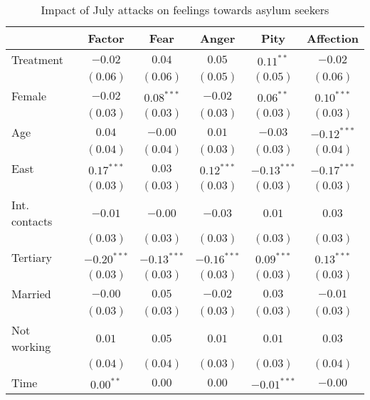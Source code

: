 
\begin{table}
\caption{Impact of July attacks on feelings towards asylum seekers}
\begin{center}
\begin{tabular}{l c c c c c}
\toprule
 & Factor & Fear & Anger & Pity & Affection \\
\midrule
Treatment     & $-0.02$       & $0.04$        & $0.05$        & $0.11^{**}$   & $-0.02$       \\
              & $(0.06)$      & $(0.06)$      & $(0.05)$      & $(0.05)$      & $(0.06)$      \\
Female        & $-0.02$       & $0.08^{***}$  & $-0.02$       & $0.06^{**}$   & $0.10^{***}$  \\
              & $(0.03)$      & $(0.03)$      & $(0.03)$      & $(0.03)$      & $(0.03)$      \\
Age           & $0.04$        & $-0.00$       & $0.01$        & $-0.03$       & $-0.12^{***}$ \\
              & $(0.04)$      & $(0.04)$      & $(0.03)$      & $(0.03)$      & $(0.04)$      \\
East          & $0.17^{***}$  & $0.03$        & $0.12^{***}$  & $-0.13^{***}$ & $-0.17^{***}$ \\
              & $(0.03)$      & $(0.03)$      & $(0.03)$      & $(0.03)$      & $(0.03)$      \\
Int. contacts & $-0.01$       & $-0.00$       & $-0.03$       & $0.01$        & $0.03$        \\
              & $(0.03)$      & $(0.03)$      & $(0.03)$      & $(0.03)$      & $(0.03)$      \\
Tertiary      & $-0.20^{***}$ & $-0.13^{***}$ & $-0.16^{***}$ & $0.09^{***}$  & $0.13^{***}$  \\
              & $(0.03)$      & $(0.03)$      & $(0.03)$      & $(0.03)$      & $(0.03)$      \\
Married       & $-0.00$       & $0.05$        & $-0.02$       & $0.03$        & $-0.01$       \\
              & $(0.03)$      & $(0.03)$      & $(0.03)$      & $(0.03)$      & $(0.03)$      \\
Not working   & $0.01$        & $0.05$        & $0.01$        & $0.01$        & $0.03$        \\
              & $(0.04)$      & $(0.04)$      & $(0.03)$      & $(0.03)$      & $(0.04)$      \\
Time          & $0.00^{**}$   & $0.00$        & $0.00$        & $-0.01^{***}$ & $-0.00$       \\

\end{tabular}
\end{center}
\end{table}
